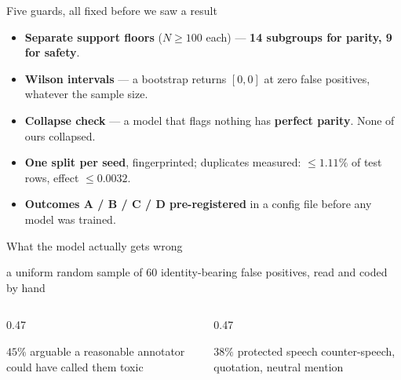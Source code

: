 \documentclass[aspectratio=169,11pt,xcolor={table}]{beamer}
\newcommand{\head}[1]{{\color{fairblue}\textbf{#1}}}
\newcommand{\hint}[1]{{\footnotesize\color{fairgrey}#1}}
\begin{document}
\begin{frame}{Five guards, all fixed before we saw a result}
  \vspace{2.4ex}
  \small
  \begin{itemize}\itemsep 1.5ex
    \item \head{Separate support floors} ($N \geq 100$ each) ---
      \textbf{14 subgroups for parity, 9 for safety}.
    \item \head{Wilson intervals} --- a bootstrap returns $[0,0]$ at zero false
      positives, whatever the sample size.
    \item \head{Collapse check} --- a model that flags nothing has
      \textbf{perfect parity}. None of ours collapsed.
    \item \head{One split per seed}, fingerprinted; duplicates measured:
      $\leq 1.11\%$ of test rows, effect $\leq 0.0032$.
    \item \head{Outcomes A / B / C / D pre-registered} in a config file before
      any model was trained.
  \end{itemize}
\end{frame}

\begin{frame}{What the model actually gets wrong}
  \vspace{1.6ex}
  \begin{center}
    \small
    
  \end{center}
  \vspace{0.6ex}
  \centerline{\hint{a uniform random sample of $60$ identity-bearing false
    positives, read and coded by hand}}
  \vspace{1.4ex}
  \begin{columns}[t,onlytextwidth]
    \begin{column}{0.47\textwidth}
      \begin{alertblock}{$45\%$ arguable}
        \small a reasonable annotator could have called them toxic
      \end{alertblock}
    \end{column}
    \begin{column}{0.47\textwidth}
      \begin{block}{$38\%$ protected speech}
        \small counter-speech, quotation, neutral mention
      \end{block}
    \end{column}
  \end{columns}
\end{frame}
\end{document}
